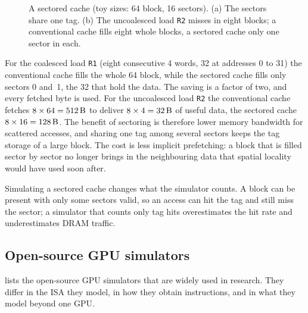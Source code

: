 \documentclass[../main.tex]{subfiles}
\begin{document}
\begin{figure}[tb]
  \centering
  
  \caption{A sectored cache (toy sizes: \SI{64}{\byte} block,
    \SI{16}{\byte} sectors).  (a) The sectors share one tag.  (b) The
    uncoalesced load \texttt{R2} misses in eight blocks; a conventional
    cache fills eight whole blocks, a sectored cache only one sector
    in each.}
  \label{fig:l08-sector-cache}
\end{figure}

For the coalesced load \texttt{R1} (eight consecutive \SI{4}{\byte}
words, \SI{32}{\byte} at addresses 0 to 31) the conventional cache fills
the whole \SI{64}{\byte} block, while the sectored cache fills only
sectors 0 and~1, the \SI{32}{\byte} that hold the data.  The saving is
a factor of two, and every fetched byte is used.  For the uncoalesced load \texttt{R2} the conventional cache
fetches $8 \times 64 = \SI{512}{\byte}$ to deliver $8 \times 4 =
\SI{32}{\byte}$ of useful data, the sectored cache
$8 \times 16 = \SI{128}{\byte}$.  The benefit of sectoring is
therefore lower memory bandwidth for scattered accesses, and sharing
one tag among several sectors keeps the tag storage of a large block.
The cost is less implicit prefetching: a block that is filled sector by
sector no longer brings in the neighbouring data that spatial locality
would have used soon after.

\begin{note}
  Simulating a sectored cache changes what the simulator counts.  A
  block can be present with only some sectors valid, so an access can
  hit the tag and still miss the sector; a simulator that counts only
  tag hits overestimates the hit rate and underestimates DRAM traffic.
\end{note}

\subsection{Open-source GPU simulators}

 lists the open-source GPU simulators that
are widely used in research.  They differ in the ISA they model, in how
they obtain instructions, and in what they model beyond one GPU.
\end{document}
